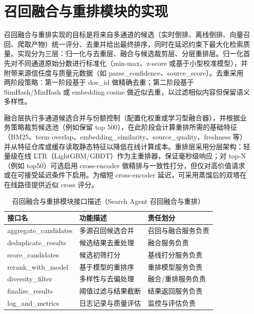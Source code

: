 \section{召回融合与重排模块的实现}
召回融合与重排实现的目标是将来自多通道的候选（实时倒排、离线倒排、向量召回、爬取产物）统一评分、去重并给出最终排序，同时在延迟约束下最大化检索质量。实现分为三层：归一化与去重层、融合与候选裁剪层、分层重排层。归一化首先对不同通道原始分数进行标准化（min-max、z-score 或基于小型校准模型），并附带来源信任度与质量元数据（如 parse\_confidence、source\_score）。去重采用两阶段策略：第一阶段基于 doc\_id 做精确去重；第二阶段基于 SimHash/MinHash 或 embedding cosine 做近似去重，以过滤相似内容但保留语义多样性。

融合层执行多通道候选合并与份额控制（配置化权重或学习型融合器），并根据业务策略裁剪候选池（例如保留 top 500），在此阶段会计算重排所需的基础特征（BM25、term overlap、embedding\_similarity、source\_quality、freshness 等）并从特征仓库或缓存读取静态特征以降低在线计算成本。重排层采用分层架构：轻量级在线 LTR（LightGBM/GBDT）作为主重排器，保证毫秒级响应；对 top-N（例如 top50）可选启用 cross-encoder 做精排与一致性打分，但仅对高价值请求或在可接受延迟条件下启用。为缩短 cross-encoder 延迟，可采用蒸馏后的双塔在在线路径提供近似 cross 评分。
\begin{table}[H]
\centering
\caption{召回融合与重排模块接口描述（Search Agent 召回融合与重排）}
\label{tab:recall-fusion-rerank-interfaces}
{\renewcommand{\arraystretch}{0.7}
\begin{tabular}{p{4cm} p{4cm} p{5cm}}
\hline
接口名 & 功能描述 & 责任划分 \\
\hline
aggregate\_candidates & 多源召回候选合并 & 召回与融合服务负责 \\\hline
deduplicate\_results & 候选结果去重处理 & 融合服务负责 \\\hline
score\_candidates & 候选初筛打分 & 基线打分服务负责 \\\hline
rerank\_with\_model & 基于模型的重排序 & 重排模型服务负责 \\\hline
diversity\_filter & 多样性与去偏处理 & 融合/重排服务负责 \\\hline
finalize\_results & 阈值过滤与结果截断 & 结果返回服务负责 \\\hline
log\_and\_metrics & 日志记录与质量评估 & 监控与评估负责 \\\hline
\end{tabular}
}
\end{table}

